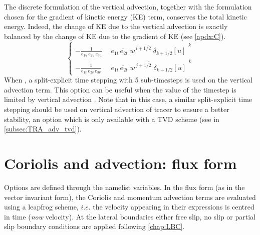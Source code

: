 \documentclass[../tex_main/NEMO_manual]{subfiles}
\begin{document}
The discrete formulation of the vertical advection, together with the formulation 
chosen for the gradient of kinetic energy (KE) term, conserves the total kinetic 
energy. Indeed, the change of KE due to the vertical advection is exactly 
balanced by the change of KE due to the gradient of KE (see \autoref{apdx:C}).
\begin{equation} \label{eq:dynzad}
\left\{ 		\begin{aligned}
-\frac{1} {e_{1u}\,e_{2u}\,e_{3u}} &\ \overline{\ \overline{ e_{1t}\,e_{2t}\;w } ^{\,i+1/2}  \;\delta _{k+1/2} \left[ u \right]\  }^{\,k}  \\
-\frac{1} {e_{1v}\,e_{2v}\,e_{3v}}  &\ \overline{\ \overline{ e_{1t}\,e_{2t}\;w } ^{\,j+1/2}  \;\delta _{k+1/2} \left[ u \right]\  }^{\,k} 
\end{aligned}         \right.
\end{equation} 
When , a split-explicit time stepping with 5 sub-timesteps is used 
on the vertical advection term.
This option can be useful when the value of the timestep is limited by vertical advection \citep{Lemarie_OM2015}. 
Note that in this case, a similar split-explicit time stepping should be used on 
vertical advection of tracer to ensure a better stability, 
an option which is only available with a TVD scheme (see  in \autoref{subsec:TRA_adv_tvd}).


\section{Coriolis and advection: flux form}
\label{sec:DYN_adv_cor_flux}


Options are defined through the  namelist variables.
In the flux form (as in the vector invariant form), the Coriolis and momentum 
advection terms are evaluated using a leapfrog scheme, $i.e.$ the velocity 
appearing in their expressions is centred in time (\textit{now} velocity). At the 
lateral boundaries either free slip, no slip or partial slip boundary conditions 
are applied following \autoref{chap:LBC}.
\end{document}
